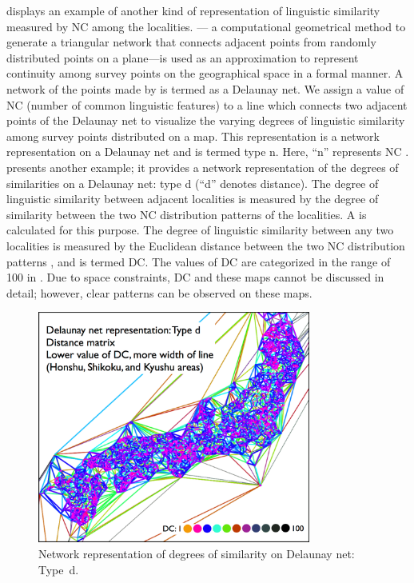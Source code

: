 \documentclass[output=paper]{LSP/langsci}
\begin{document}
 displays an example of another kind of representation of linguistic similarity measured by NC among the localities.  — a computational geometrical method to generate a triangular network that connects adjacent points from randomly distributed points on a plane—is used as an approximation to represent continuity among survey points on the geographical space in a formal manner. A network of the points made by  is termed as a Delaunay net. We assign a value of NC (number of common linguistic features) to a line which connects two adjacent points of the Delaunay net to visualize the varying degrees of linguistic similarity among survey points distributed on a map. This representation is a network representation on a Delaunay net and is termed type n. Here, “n” represents NC \citep[2, 4]{kumagai_development_2013}.  presents another example; it provides a network representation of the degrees of similarities on a Delaunay net: type d (“d” denotes distance). The degree of linguistic similarity between adjacent localities is measured by the degree of similarity between the two NC distribution patterns of the localities. A  is calculated for this purpose. The degree of linguistic similarity between any two localities is measured by the Euclidean distance between the two NC distribution patterns \citep[2, 4]{kumagai_development_2013}, and is termed DC. The values of DC are categorized in the range of 100 in . Due to space constraints, DC and these maps cannot be discussed in detail; however, clear patterns can be observed on these maps.


\begin{figure}[t]
\includegraphics[width=0.8\textwidth]{illustrations/kuma_fig23}
\caption{Network representation of degrees of similarity on Delaunay net: Type~d.}
\label{fig:23}
\end{figure}          
\end{document}
